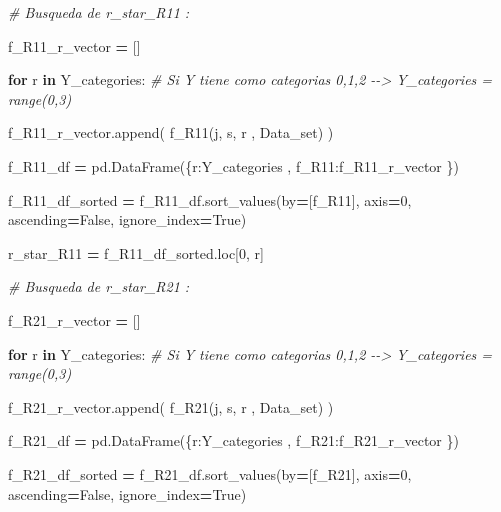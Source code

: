 \documentclass[
  11pt,
  a4paper,
]{article}
\newenvironment{Shaded}{\begin{snugshade}}{\end{snugshade}}
\newcommand{\CommentTok}[1]{\textcolor[rgb]{0.56,0.35,0.01}{\textit{#1}}}
\newcommand{\ControlFlowTok}[1]{\textcolor[rgb]{0.13,0.29,0.53}{\textbf{#1}}}
\newcommand{\DecValTok}[1]{\textcolor[rgb]{0.00,0.00,0.81}{#1}}
\newcommand{\KeywordTok}[1]{\textcolor[rgb]{0.13,0.29,0.53}{\textbf{#1}}}
\newcommand{\NormalTok}[1]{#1}
\newcommand{\OperatorTok}[1]{\textcolor[rgb]{0.81,0.36,0.00}{\textbf{#1}}}
\newcommand{\StringTok}[1]{\textcolor[rgb]{0.31,0.60,0.02}{#1}}
\newcommand{\VariableTok}[1]{\textcolor[rgb]{0.00,0.00,0.00}{#1}}
\begin{document}
\begin{Shaded}
\begin{Highlighting}[]
                \CommentTok{\# Busqueda de r\_star\_R11 :}

\NormalTok{                f\_R11\_r\_vector }\OperatorTok{=}\NormalTok{ []}

                \ControlFlowTok{for}\NormalTok{ r }\KeywordTok{in}\NormalTok{ Y\_categories:  }\CommentTok{\# Si Y tiene como categorias 0,1,2 {-}{-}\textgreater{} Y\_categories = range(0,3)}

\NormalTok{                    f\_R11\_r\_vector.append( f\_R11(j, s, r , Data\_set) )}

\NormalTok{                f\_R11\_df }\OperatorTok{=}\NormalTok{ pd.DataFrame(\{}\StringTok{\textquotesingle{}r\textquotesingle{}}\NormalTok{:Y\_categories  , }\StringTok{\textquotesingle{}f\_R11\textquotesingle{}}\NormalTok{:f\_R11\_r\_vector \})}
        
\NormalTok{                f\_R11\_df\_sorted }\OperatorTok{=}\NormalTok{ f\_R11\_df.sort\_values(by}\OperatorTok{=}\NormalTok{[}\StringTok{\textquotesingle{}f\_R11\textquotesingle{}}\NormalTok{], axis}\OperatorTok{=}\DecValTok{0}\NormalTok{, ascending}\OperatorTok{=}\VariableTok{False}\NormalTok{, ignore\_index}\OperatorTok{=}\VariableTok{True}\NormalTok{)}

\NormalTok{                r\_star\_R11 }\OperatorTok{=}\NormalTok{ f\_R11\_df\_sorted.loc[}\DecValTok{0}\NormalTok{, }\StringTok{\textquotesingle{}r\textquotesingle{}}\NormalTok{]}


                \CommentTok{\# Busqueda de r\_star\_R21 :}

\NormalTok{                f\_R21\_r\_vector }\OperatorTok{=}\NormalTok{ []}

                \ControlFlowTok{for}\NormalTok{ r }\KeywordTok{in}\NormalTok{ Y\_categories:  }\CommentTok{\# Si Y tiene como categorias 0,1,2 {-}{-}\textgreater{} Y\_categories = range(0,3)}

\NormalTok{                    f\_R21\_r\_vector.append( f\_R21(j, s, r , Data\_set) )}

\NormalTok{                f\_R21\_df }\OperatorTok{=}\NormalTok{ pd.DataFrame(\{}\StringTok{\textquotesingle{}r\textquotesingle{}}\NormalTok{:Y\_categories  , }\StringTok{\textquotesingle{}f\_R21\textquotesingle{}}\NormalTok{:f\_R21\_r\_vector \})}
        
\NormalTok{                f\_R21\_df\_sorted }\OperatorTok{=}\NormalTok{ f\_R21\_df.sort\_values(by}\OperatorTok{=}\NormalTok{[}\StringTok{\textquotesingle{}f\_R21\textquotesingle{}}\NormalTok{], axis}\OperatorTok{=}\DecValTok{0}\NormalTok{, ascending}\OperatorTok{=}\VariableTok{False}\NormalTok{, ignore\_index}\OperatorTok{=}\VariableTok{True}\NormalTok{)}


\end{Highlighting}
\end{Shaded}
\end{document}

